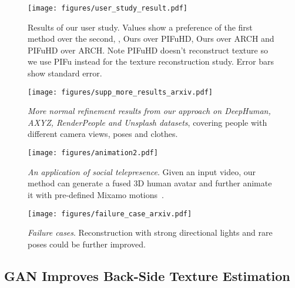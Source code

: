 \documentclass[10pt,twocolumn,letterpaper]{article}
\newcommand{\beforefigcaption}{\vspace{-5mm}}
\newcommand{\afterfigcaption}{\vspace{-5mm}}
\begin{document}
\begin{figure*}[ptb]
\centering
\texttt{[image: figures/user\_study\_result.pdf]}
\caption{Results of our user study. Values  show a preference of the first method over the second, \ie, Ours over PIFuHD, Ours over ARCH and PIFuHD over ARCH. Note PIFuHD doesn't reconstruct texture so we use PIFu instead for the texture reconstruction study. Error bars show standard error.}
\label{fig:user_study}
\vspace{-8 pt}
\end{figure*}



\begin{figure*}[ptb]
\vspace{+6 pt}
\centering
\texttt{[image: figures/supp\_more\_results\_arxiv.pdf]}
\beforefigcaption
\vspace{+7 pt}
\caption{\textit{More normal refinement results from our approach on DeepHuman, AXYZ, RenderPeople and Unsplash datasets}, covering people with different camera views, poses and clothes. 
}
\afterfigcaption
\label{fig:supp_more_results}
\vspace{+20 pt}
\end{figure*}

\begin{figure*}[ptb]
\centering
\texttt{[image: figures/animation2.pdf]}
\beforefigcaption
\vspace{+4pt}
\caption{\textit{An application of social telepresence}. Given an input video, our method can generate a fused 3D human avatar and further animate it with pre-defined Mixamo motions~\cite{mixamo}.
}
\afterfigcaption
\label{fig:animation}
\vspace{+13 pt}
\end{figure*}

\begin{figure*}[ptb]
\centering
\texttt{[image: figures/failure\_case\_arxiv.pdf]}
\beforefigcaption
\vspace{+3pt}
\caption{\textit{Failure cases}. Reconstruction with strong directional lights and rare poses could be further improved.}
\afterfigcaption
\label{fig:failure_case}
\vspace{+8 pt}
\end{figure*}

\subsection{GAN Improves Back-Side Texture Estimation}
\end{document}
